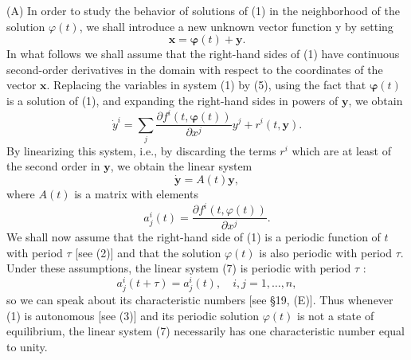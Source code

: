 \documentclass[10pt,a5paper]{book}
\theoremstyle{plain}
\theoremstyle{definition}
\theoremstyle{remark}
\begin{document}
(A) In order to study the behavior of solutions of (1) in the neighborhood of the solution $\varphi(t)$, we shall introduce a new unknown vector function y by setting
\begin{equation*}
\mathbf{x}=\boldsymbol{\varphi}(t)+\mathbf{y} . \tag{5}
\end{equation*}
In what follows we shall assume that the right-hand sides of (1) have continuous second-order derivatives in the domain with respect to the coordinates of the vector $\mathbf{x}$. Replacing the variables in system (1) by (5), using the fact that $\boldsymbol{\varphi}(t)$ is a solution of (1), and expanding the right-hand
sides in powers of $\mathbf{y}$, we obtain
\begin{equation*}
\dot{y}^{i}=\sum_{j} \frac{\partial f^{i}(t, \boldsymbol{\varphi}(t))}{\partial x^{j}} y^{j}+r^{i}(t, \mathbf{y}) . \tag{6}
\end{equation*}
By linearizing this system, i.e., by discarding the terms $r^{i}$ which are at least of the second order in $\mathbf{y}$, we obtain the linear system
\begin{equation*}
\dot{\mathbf{y}}=A(t) \mathbf{y}, \tag{7}
\end{equation*}
where $A(t)$ is a matrix with elements
\[
a_{j}^{i}(t)=\frac{\partial f^{i}(t, \varphi(t))}{\partial x^{j}} .
\]
We shall now assume that the right-hand side of (1) is a periodic function of $t$ with period $\tau$ [see (2)] and that the solution $\varphi(t)$ is also periodic with period $\tau$. Under these assumptions, the linear system (7) is periodic with period $\tau$ :
\[
a_{j}^{i}(t+\tau)=a_{j}^{i}(t), \quad i, j=1, \ldots, n,
\]
so we can speak about its characteristic numbers [see §19, (E)]. Thus whenever (1) is autonomous [see (3)] and its periodic solution $\varphi(t)$ is not a state of equilibrium, the linear system (7) necessarily has one characteristic number equal to unity.
\end{document}
